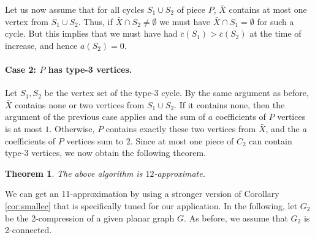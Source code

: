 \documentclass{article}
\newcommand{\0}{\mathbb{0}}
\newcommand{\1}{\mathbb{1}}
\newtheorem{theorem}{Theorem}[section]
\begin{document}
Let us now assume that for all cycles $S_1 \cup S_2$ of piece $P$, $\bar{X}$
contains at most one vertex from $S_1 \cup S_2$. Thus, if $\bar{X} \cap S_2
\neq \emptyset$ we must have $\bar{X}\cap S_1=\emptyset$ for such a cycle. But
this implies that we must have had $\bar{c} (S_1)>\bar{c}(S_2)$ at the time of
increase, and hence $a(S_2)=0$. 

\paragraph{Case 2: $P$ has type-3 vertices.}

Let $S_1,S_2$ be the vertex set of the type-3 cycle. By the same argument as before, 
$\bar{X}$ contains none or two vertices from $S_1 \cup S_2$. If it contains none, then the
argument of the previous case applies and the sum of $a$ coefficients of $P$ vertices is
at most $1$. Otherwise, $P$ contains exactly these two vertices from $\bar{X}$, and the
$a$ coefficients of $P$ vertices sum to $2$. Since at most one piece of $C_2$ can contain
type-3 vertices, we now obtain the following theorem. 

\begin{theorem}
  The above algorithm is $12$-approximate. 
\end{theorem}

We can get an 11-approximation by using a stronger version of Corollary \ref{cor:smallec}
that is specifically tuned for our application. In the following, let $G_2$ be the
2-compression of a given planar graph $G$. As before, we assume that $G_2$ is 2-connected.
\end{document}
